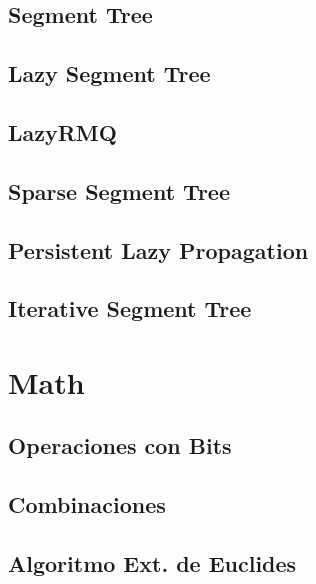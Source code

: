 \subsection{Segment Tree}
\raggedbottom
\hrulefill
\subsection{Lazy Segment Tree}
\raggedbottom
\hrulefill
\subsection{LazyRMQ}
\raggedbottom
\hrulefill
\subsection{Sparse Segment Tree}
\raggedbottom
\hrulefill
\subsection{Persistent Lazy Propagation}
\raggedbottom
\hrulefill
\subsection{Iterative Segment Tree}
\raggedbottom
\hrulefill
\newpage

\section{Math}
\subsection{Operaciones con Bits}
\raggedbottom
\hrulefill
\subsection{Combinaciones}
\raggedbottom
\hrulefill
\subsection{Algoritmo Ext. de Euclides}
\raggedbottom
\hrulefill
